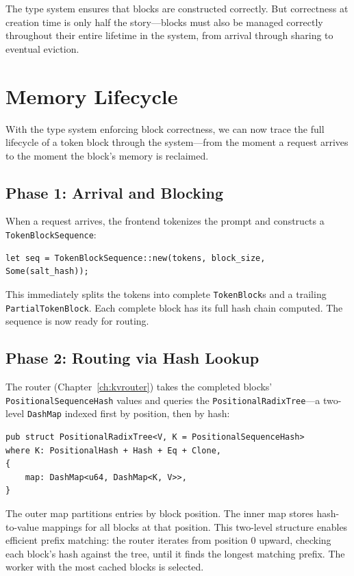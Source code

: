 \medskip
The type system ensures that blocks are constructed correctly. But correctness at creation time is only half the story---blocks must also be managed correctly throughout their entire lifetime in the system, from arrival through sharing to eventual eviction.

\section{Memory Lifecycle}
\label{sec:tokens:lifecycle}

With the type system enforcing block correctness, we can now trace the full lifecycle of a token block through the system---from the moment a request arrives to the moment the block's memory is reclaimed.

\subsection{Phase 1: Arrival and Blocking}

When a request arrives, the frontend tokenizes the prompt and constructs a \texttt{TokenBlockSequence}:

\begin{verbatim}
let seq = TokenBlockSequence::new(tokens, block_size, Some(salt_hash));
\end{verbatim}

This immediately splits the tokens into complete \texttt{TokenBlock}s and a trailing \texttt{PartialTokenBlock}. Each complete block has its full hash chain computed. The sequence is now ready for routing.

\subsection{Phase 2: Routing via Hash Lookup}

The router (Chapter~\ref{ch:kvrouter}) takes the completed blocks' \texttt{PositionalSequenceHash} values and queries the \texttt{PositionalRadixTree}---a two-level \texttt{DashMap} indexed first by position, then by hash:

\begin{verbatim}
pub struct PositionalRadixTree<V, K = PositionalSequenceHash>
where K: PositionalHash + Hash + Eq + Clone,
{
    map: DashMap<u64, DashMap<K, V>>,
}
\end{verbatim}

The outer map partitions entries by block position. The inner map stores hash-to-value mappings for all blocks at that position. This two-level structure enables efficient prefix matching: the router iterates from position 0 upward, checking each block's hash against the tree, until it finds the longest matching prefix. The worker with the most cached blocks is selected.

